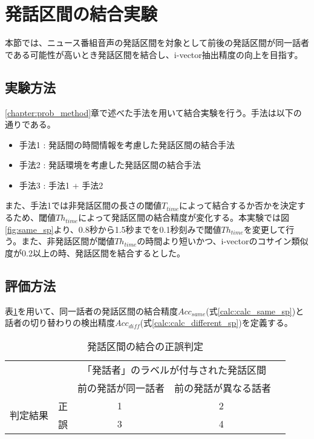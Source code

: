 \section{発話区間の結合実験}
\label{chapter:connect_sp}
本節では、ニュース番組音声の発話区間を対象として前後の発話区間が同一話者である可能性が高いとき発話区間を結合し、i-vector抽出精度の向上を目指す。

\subsection{実験方法}
\ref{chapter:prob_method}章で述べた手法を用いて結合実験を行う。手法は以下の通りである。

\begin{itemize}
\item 手法1 : 発話間の時間情報を考慮した発話区間の結合手法
\item 手法2 : 発話環境を考慮した発話区間の結合手法
\item 手法3 : 手法1 + 手法2
\end{itemize}\par\par

また、手法1では非発話区間の長さの閾値$T_{time}$によって結合するか否かを決定するため、閾値$Th_{time}$によって発話区間の結合精度が変化する。本実験では図\ref{fig:same_sp}より、0.8秒から1.5秒までを0.1秒刻みで閾値$Th_{time}$を変更して行う。また、非発話区間が閾値$Th_{time}$の時間より短いかつ、i-vectorのコサイン類似度が0.2以上の時、発話区間を結合するとした。

\subsection{評価方法}
表\ref{table:connect_calc}を用いて、同一話者の発話区間の結合精度$Acc_{same}$(式\ref{calc:calc_same_sp})と話者の切り替わりの検出精度$Acc_{diff}$(式\ref{calc:calc_different_sp})を定義する。

\begin{table}[H]
\begin{center}
    \caption{発話区間の結合の正誤判定 \label{table:connect_calc}}
\begin{tabular}{|c|c|c|c|l}
\cline{1-4}
\multicolumn{2}{|c|}{\multirow{2}{*}{}} & \multicolumn{2}{c|}{「発話者」のラベルが付与された発話区間} &  \\ \cline{3-4}
\multicolumn{2}{|c|}{}                  & 前の発話が同一話者        & 前の発話が異なる話者        &  \\ \cline{1-4}
\multirow{2}{*}{判定結果}        & 正        & \textcircled{\scriptsize 1}                  & \textcircled{\scriptsize 2}                   &  \\ \cline{2-4}
& 誤        & \textcircled{\scriptsize 3}                  & \textcircled{\scriptsize 4}                   &  \\ \cline{1-4}
\end{tabular}
\end{center}
\end{table}

